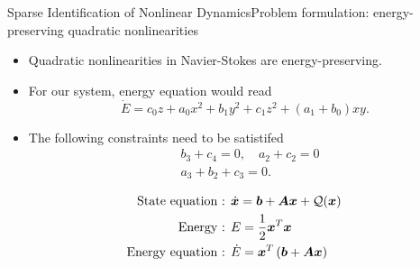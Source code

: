 \begin{frame}[t, c]{Sparse Identification of Nonlinear Dynamics}{Problem formulation: energy-preserving quadratic nonlinearities}
  \begin{minipage}{.58\textwidth}
    \begin{itemize}
    \item Quadratic nonlinearities in Navier-Stokes are energy-preserving.
      
      \medskip
      
    \item For our system, energy equation would read
      \[
        \dot{E} = c_0 z + a_0 x^2 + b_1 y^2 + c_1 z^2 + (a_1 + b_0) xy.
      \]
      
    \item The following constraints need to be satistifed
      \[
        \begin{aligned}
          & b_3 + c_4 = 0, \quad a_2 + c_2 = 0 \\
          & a_3 + b_2 + c_3 = 0.
        \end{aligned}
      \]
    \end{itemize}
  \end{minipage}%
  \hfill
  \begin{minipage}{.38\textwidth}
    \begin{equation}
      \begin{aligned}
        \textrm{State equation : } & \dot{\bm{x}} = \bm{b} + \bm{Ax} + \mathcal{Q}(\bm{x}) \\
        \textrm{Energy : } & E = \frac{1}{2} \bm{x}^T \bm{x} \\
        \textrm{Energy equation : } & \dot{E} = \bm{x}^T \left( \bm{b} + \bm{Ax} \right)
      \end{aligned}
      \notag
    \end{equation}
  \end{minipage}
  
  \vspace{1cm}
\end{frame}

